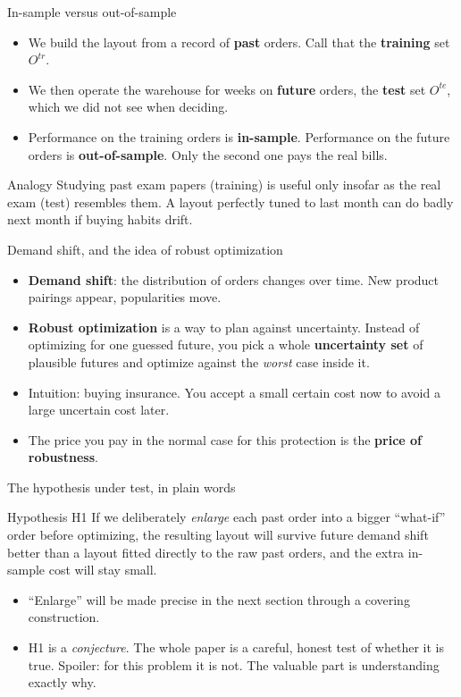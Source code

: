 \documentclass[11pt,aspectratio=169]{beamer}
\newcommand{\term}[1]{\textcolor{blue!60!black}{\textbf{#1}}}
\begin{document}
\begin{frame}{In-sample versus out-of-sample}
  \begin{itemize}
    \item We build the layout from a record of \term{past} orders. Call that the \term{training} set $O^{tr}$.
    \item We then operate the warehouse for weeks on \term{future} orders, the \term{test} set $O^{te}$, which we did not see when deciding.
    \item Performance on the training orders is \term{in-sample}. Performance on the future orders is \term{out-of-sample}. Only the second one pays the real bills.
  \end{itemize}
  \begin{block}{Analogy}
  Studying past exam papers (training) is useful only insofar as the real exam (test) resembles them. A layout perfectly tuned to last month can do badly next month if buying habits drift.
  \end{block}
\end{frame}

\begin{frame}{Demand shift, and the idea of robust optimization}
  \begin{itemize}
    \item \term{Demand shift}: the distribution of orders changes over time. New product pairings appear, popularities move.
    \item \term{Robust optimization} is a way to plan against uncertainty. Instead of optimizing for one guessed future, you pick a whole \term{uncertainty set} of plausible futures and optimize against the \emph{worst} case inside it.
    \item Intuition: buying insurance. You accept a small certain cost now to avoid a large uncertain cost later.
    \item The price you pay in the normal case for this protection is the \term{price of robustness}.
  \end{itemize}
\end{frame}

\begin{frame}{The hypothesis under test, in plain words}
  \begin{alertblock}{Hypothesis H1}
  If we deliberately \emph{enlarge} each past order into a bigger ``what-if'' order before optimizing, the resulting layout will survive future demand shift better than a layout fitted directly to the raw past orders, and the extra in-sample cost will stay small.
  \end{alertblock}
  \begin{itemize}
    \item ``Enlarge'' will be made precise in the next section through a covering construction.
    \item H1 is a \emph{conjecture}. The whole paper is a careful, honest test of whether it is true. Spoiler: for this problem it is not. The valuable part is understanding exactly why.
  \end{itemize}
\end{frame}
\end{document}
